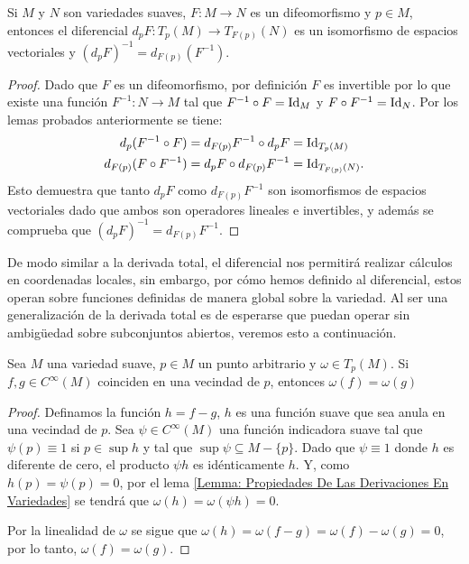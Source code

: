 \begin{lemma}\label{Lemma: Diferencial de un Difeomorfismo}
	Si $M$ y $N$ son variedades suaves, $F: M \to N$ es un difeomorfismo y $p \in M$, entonces el diferencial $d_pF: T_p(M) \to T_{F(p)}(N)$ es un isomorfismo de espacios vectoriales y $(d_pF)^{-1} = d_{F(p)}(F^{-1})$.
\end{lemma}

\begin{proof}
	Dado que $F$ es un difeomorfismo, por definición $F$ es invertible por lo que existe una función $F^{-1}: N \to M$ tal que $F^{-1} \circ F = \mathrm{Id}_M$ y $F \circ F^{-1} = \mathrm{Id}_N$. Por los lemas probados anteriormente se tiene:
	\begin{align*}
		d_p(F^{-1} \circ F)      & = d_{F(p)}F^{-1} \circ d_pF = \mathrm{Id}_{T_p(M)}       \\
		d_{F(p)}(F \circ F^{-1}) & = d_pF \circ d_{F(p)}F^{-1} = \mathrm{Id}_{T_{F(p)}(N)}. \\
	\end{align*}
	Esto demuestra que tanto $d_pF$ como $d_{F(p)}F^{-1}$ son isomorfismos de espacios vectoriales dado que ambos son operadores lineales e invertibles, y además se comprueba que $(d_pF)^{-1} = d_{F(p)}F^{-1}$.
\end{proof}

De modo similar a la derivada total, el diferencial nos permitirá realizar cálculos en coordenadas locales, sin embargo, por cómo hemos definido al diferencial, estos operan sobre funciones definidas de manera global sobre la variedad. Al ser una generalización de la derivada total es de esperarse que puedan operar sin ambigüedad sobre subconjuntos abiertos, veremos esto a continuación.

\begin{lemma}
	Sea $M$ una variedad suave, $p \in M$ un punto arbitrario y $\omega \in T_{p}(M)$. Si $f,g \in C^{\infty}(M)$ coinciden en una vecindad de $p$, entonces $\omega(f) = \omega(g)$
\end{lemma}

\begin{proof}
	Definamos la función $h = f - g$, $h$ es una función suave que sea anula en una vecindad de $p$. Sea $\psi \in C^{\infty}(M)$ una función indicadora suave tal que $\psi(p) \equiv 1$ si $p \in \sup h$ y tal que $\sup \psi \subseteq M - \{p\}$. Dado que $\psi \equiv 1$ donde $h$ es diferente de cero, el producto $\psi h$ es idénticamente $h$. Y, como $h(p) = \psi(p) = 0$, por el lema \ref{Lemma: Propiedades De Las Derivaciones En Variedades} se tendrá que $\omega (h) = \omega (\psi h) = 0$.

	Por la linealidad de $\omega$ se sigue que $\omega(h) = \omega (f - g) = \omega(f) - \omega(g) = 0$, por lo tanto, $\omega(f) = \omega(g)$.
\end{proof}

